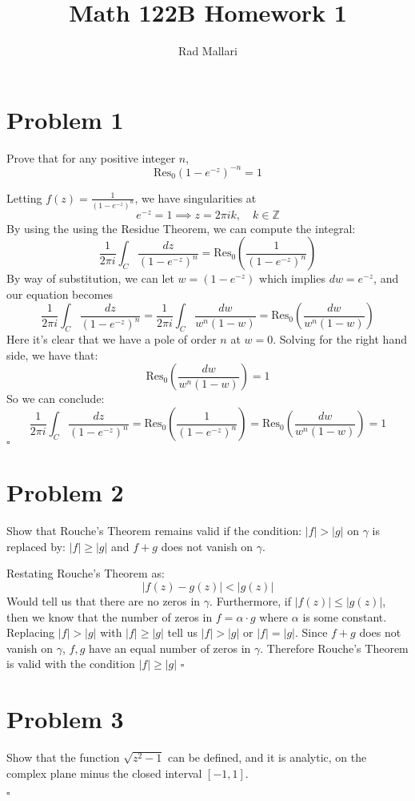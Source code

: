 \documentclass[11pt]{article}
\title{Math 122B Homework 1}
\author{Rad Mallari}
\newcommand{\Z}{\mathbb{Z}}
\newenvironment{proof}{\noindent{\bf Proof.}}{\hfill $\square$\medskip}
\begin{document}
\maketitle

\section{Problem 1}
Prove that for any positive integer $n$,
$$\text{Res}_{0}(1-e^{-z})^{-n}=1$$

\begin{proof}
Letting $f(z)=\frac{1}{(1-e^{-z})^{n}}$, we have singularities at
$$e^{-z}=1\implies z=2\pi ik,\quad k\in\Z$$
By using the using the Residue Theorem, we can compute the integral:
$$\frac{1}{2\pi i}\int_{C}\frac{dz}{(1-e^{-z})^{n}}=\text{Res}_{0}\left(\frac{1}{(1-e^{-z})^{n}}\right)$$
By way of substitution, we can let $w=(1-e^{-z})$ which implies $dw=e^{-z}$, and our equation becomes
$$\frac{1}{2\pi i}\int_{C}\frac{dz}{(1-e^{-z})^{n}}=\frac{1}{2\pi i}\int_{C}\frac{dw}{w^{n}(1-w)}=\text{Res}_{0}\left(\frac{dw}{w^{n}(1-w)}\right)$$
Here it's clear that we have a pole of order $n$ at $w=0$. Solving for the right hand side, we have that:
$$\text{Res}_{0}\left(\frac{dw}{w^{n}(1-w)}\right)=1$$ 
So we can conclude:
$$\frac{1}{2\pi i}\int_{C}\frac{dz}{(1-e^{-z})^{n}}=\text{Res}_{0}\left(\frac{1}{(1-e^{-z})^{n}}\right)=\text{Res}_{0}\left(\frac{dw}{w^{n}(1-w)}\right)=1$$
\end{proof}

\section{Problem 2}
Show that Rouche's Theorem remains valid if the condition: $|f|>|g|$ on $\gamma$ is replaced by:
$|f|\geq|g|$ and $f+g$ does not vanish on $\gamma$.

\begin{proof}
Restating Rouche's Theorem as:
$$|f(z)-g(z)|<|g(z)|$$
Would tell us that there are no zeros in $\gamma$. Furthermore, if $|f(z)|\leq|g(z)|$, then we know that the number of zeros in $f=\alpha\cdot g$ where $\alpha$ is some constant. Replacing $|f|>|g|$ with $|f|\geq|g|$ tell us $|f|>|g|$ or $|f|=|g|$. Since $f+g$ does not vanish on $\gamma$, $f,g$ have an equal number of zeros in $\gamma$. Therefore Rouche's Theorem is valid with the condition $|f|\geq|g|$
\end{proof}

\section{Problem 3}
Show that the function $\sqrt{z^{2}-1}$ can be defined, and it is analytic, on the complex plane
minus the closed interval $[-1,1]$.

\begin{proof}

\end{proof}
\end{document}
